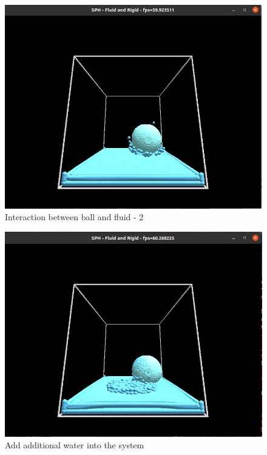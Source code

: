 \documentclass[acmtog]{acmart}
\begin{document}
\begin{figure}[H]
    \centering
    \includegraphics[scale=0.2]{../6.png}
    \caption{Interaction between ball and fluid - 2}
\end{figure}

\begin{figure}[H]
    \centering
    \includegraphics[scale=0.2]{../3.png}
    \caption{Add additional water into the system}
\end{figure}
\end{document}
